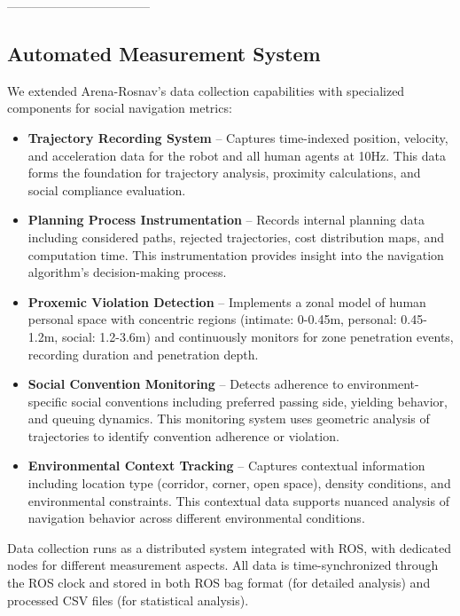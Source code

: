-----------------------------------

\subsection{Automated Measurement System}
\label{subsec:automated_measurement}
We extended Arena-Rosnav's data collection capabilities with specialized components 
for social navigation metrics:
\begin{itemize}
        \item \textbf{Trajectory Recording System} -- Captures time-indexed position, 
        velocity, and acceleration data for the robot and all human agents at 10Hz. 
        This data forms the foundation for trajectory analysis, proximity calculations, 
        and social compliance evaluation.
        \item \textbf{Planning Process Instrumentation} -- Records internal planning data 
        including considered paths, rejected trajectories, cost distribution maps, and 
        computation time. This instrumentation provides insight into the navigation 
        algorithm's decision-making process.
        \item \textbf{Proxemic Violation Detection} -- Implements a zonal model of 
        human personal space with concentric regions (intimate: 0-0.45m, personal: 0.45-1.2m, 
        social: 1.2-3.6m) and continuously monitors for zone penetration events, recording 
        duration and penetration depth.
        \item \textbf{Social Convention Monitoring} -- Detects adherence to environment-specific 
        social conventions including preferred passing side, yielding behavior, and queuing 
        dynamics. This monitoring system uses geometric analysis of trajectories to identify 
        convention adherence or violation.
        \item \textbf{Environmental Context Tracking} -- Captures contextual information 
        including location type (corridor, corner, open space), density conditions, and 
        environmental constraints. This contextual data supports nuanced analysis of 
        navigation behavior across different environmental conditions.
    \end{itemize}
Data collection runs as a distributed system integrated with ROS, with dedicated nodes 
for different measurement aspects. All data is time-synchronized through the ROS clock 
and stored in both ROS bag format (for detailed analysis) and processed CSV files 
(for statistical analysis).

